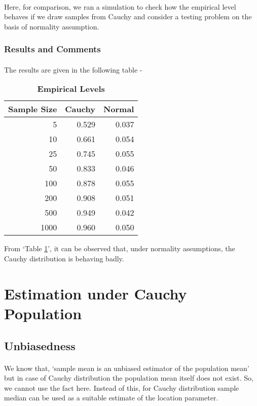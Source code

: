 \documentclass[12pt, fleqn, a4paper]{article}
\begin{document}
	\paragraph{} Here, for comparison, we ran a simulation to check how the empirical level behaves if we draw samples from Cauchy and consider a testing problem on the basis of normality assumption. 
	
	\subsubsection*{Results and Comments}
	\paragraph{} The results are given in the following table - 
	\begin{table}[H] \centering
		\caption{\textbf{Empirical Levels}}
		\label{emp.lvl}
		\renewcommand{\arraystretch}{1.2}
		\begin{tabular}{|r|r|r|}
			\hline
			\textbf{Sample Size} & \textbf{Cauchy} & \textbf{Normal}\\
			\hline
			5 & 0.529 & 0.037\\
			\hline
			10 & 0.661 & 0.054\\
			\hline
			25 & 0.745 & 0.055\\
			\hline
			50 & 0.833 & 0.046\\
			\hline
			100 & 0.878 & 0.055\\
			\hline
			200 & 0.908 & 0.051\\
			\hline
			500 & 0.949 & 0.042\\
			\hline
			1000 & 0.960 & 0.050\\
			\hline
		\end{tabular}
	\end{table}
	From `Table \ref{emp.lvl}', it can be observed that, under normality assumptions, the Cauchy distribution is behaving badly. 
	
	\newpage
	\section{Estimation under Cauchy Population}
	\subsection{Unbiasedness}
	\paragraph{} We know that, `sample mean is an unbiased estimator of the population mean' but in case of Cauchy distribution the population mean itself does not exist. So, we cannot use the fact here. Instead of this, for Cauchy distribution sample median can be used as a suitable estimate of the location parameter. 
\end{document}
